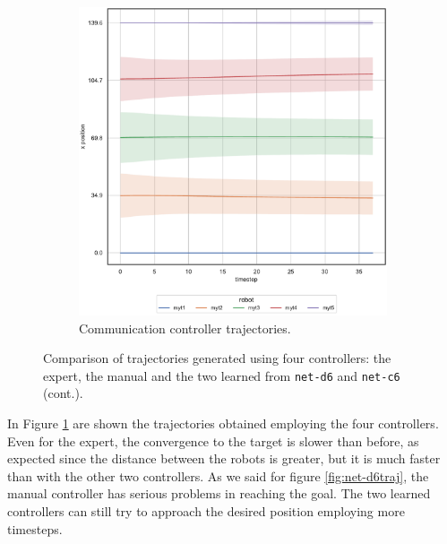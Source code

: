 \begin{figure}[!htb]
\begin{center}
\begin{subfigure}[h]{0.49\textwidth}
			\includegraphics[width=.9\textwidth]{contents/images/net-c6/position-overtime-learned_communication}
			\caption{Communication controller trajectories.}
		\end{subfigure}
	\end{center}
	\vspace{-0.5cm}
	\caption[]{Comparison of trajectories generated using four controllers: the 
	expert, the manual and the two learned from \texttt{net-d6} and 
	\texttt{net-c6} (cont.).}
	\label{fig:net-c6traj}
\end{figure}
In Figure \ref{fig:net-c6traj} are shown the trajectories obtained employing the 
four controllers. Even for the expert, the convergence to the target is slower than 
before, as expected since the distance between the robots is greater, but it is 
much faster than with the other two controllers. As we said for figure 
\ref{fig:net-d6traj}, the manual controller has serious problems in reaching the 
goal. The two learned controllers can still try to approach the desired position 
employing more timesteps.

